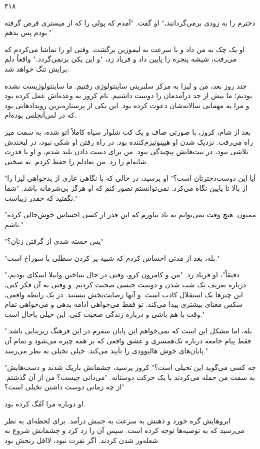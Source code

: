 ۴۱۸

دخترم را به زودی برمی‌گردانند،" او گفت. "آمدم که پولی را که از میستری قرض گرفته بودم پس بدهم."

او یک چک به من داد و با سرعت به لیموزین برگشت. وقتی او را تماشا می‌کردم که می‌رفت، شیشه پنجره را پایین داد و فریاد زد، "و این یکی برنمی‌گردد." واقعاً دلم برایش تنگ خواهد شد.

چند روز بعد، من و لیزا به مرکز سلبریتی ساینتولوژی رفتیم. ما ساینتولوژیست نشده بودیم؛ ما بیش از حد درآمدمان را دوست داشتیم. تام کروز به وعده‌اش عمل کرده بود و مرا به مهمانی سالانه‌شان دعوت کرده بود. این یکی از پرستاره‌ترین رویدادهایی بود که در لس‌آنجلس بوده‌ام.

بعد از شام، کروز، با صورتی صاف و یک کت شلوار سیاه کاملاً اتو شده، به سمت میز راه می‌رفت. نزدیک شدن او هیپنوتیزم‌کننده بود: در راه رفتن او شکی نبود، در لبخندش تلاشی نبود، در نیت‌هایش پیچیدگی نبود. من برای دست دادن بلند شدم، و او با قدرت شانه‌ام را زد. من تعادلم را حفظ کردم. به سختی.

"آیا این دوست‌دخترتان است؟" او پرسید، در حالی که با نگاهی عاری از بدخواهی لیزا را از بالا تا پایین نگاه می‌کرد. نمی‌توانستم تصور کنم که او هرگز بی‌شرمانه باشد. "شما نگفتید که چقدر زیباست."

"ممنون. هیچ وقت نمی‌توانم به یاد بیاورم که این قدر از کسی احساس خوش‌حالی کرده باشم."

"پس خسته شدی از گرفتن زنان؟"

"بله، بعد از مدتی احساس کردم که شبیه پر کردن سطلی با سوراخ است."

"دقیقاً"، او فریاد زد. "من و کامرون کرو، وقتی در حال ساختن وانیلا اسکای بودیم، درباره تعریف یک شب شدن و دوست جنسی صحبت کردیم. و وقتی به آن فکر کنی، این چیزها یک استقلال کاذب است. و آنها رضایت‌بخش نیستند. در یک رابطه واقعی، سکس معنای بیشتری پیدا می‌کند. تو فقط می‌خواهی ادامه بدهی و می‌خواهی تمام وقت با هم باشی و درباره زندگی صحبت کنی. این خیلی باحال است."

"بله، اما مشکل این است که نمی‌خواهم این پایان سفرم در این فرهنگ زیربنایی باشد. فقط پیام جامعه درباره تک‌همسری و عشق واقعی که بر همه چیره می‌شود و تمام آن پایان‌های خوش هالیوودی را تأیید می‌کند. خیلی تخیلی به نظر می‌رسد."

"چه کسی می‌گوید این تخیلی است؟" کروز پرسید، چشمانش باریک شدند و دست‌هایش به سمت من حمله می‌کردند با یک حرکت دوستانه. "می‌دانی چیست؟ من از آن گذشتم. از چه زمانی دوست داشتن تخیلی است؟"

او دوباره مرا آمُگ کرده بود.

ابروهایش گره خورد و ذهنش به سرعت به جنبش درآمد. برای لحظه‌ای به نظر می‌رسید که به توصیه‌ها توجه کرده است. سپس آن را رد کرد و چشمانش شروع به شعله‌ور شدن کردند. اگر نفرت نبود، لااقل رنجش بود.